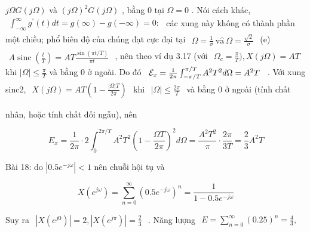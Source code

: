 \documentclass[
  10
]{article}
\begin{document}
\(j \Omega G ( j \Omega )\) và \(( j \Omega ) ^ { 2 } G ( j \Omega )\) ,
bằng 0 tại \(\Omega = 0\) . Nói cách khác,
\(\begin{array} { r } { \int _ { - \infty } ^ { \infty } g ^ { \prime } ( t ) d t = g ( \infty ) - g ( - \infty ) = 0 { : } } \end{array}\)
các xung này không có thành phần một chiều; phổ biên độ của chúng đạt
cực đại tại
\(\begin{array} { r } { \Omega = \frac { 1 } { \sigma } \mathrm { \ v { \hat { a } } \ } \Omega = \frac { \sqrt { 2 } } { \sigma } } \end{array}\)
(e)
\(\begin{array} { r } { A \operatorname { s i n c } ( \frac { t } { T } ) = A T \frac { \sin ( \pi t / T ) } { \pi t } } \end{array}\)
, nên theo ví dụ 3.17 (với
\(\begin{array} { r } { \Omega _ { c } = \frac { \pi } { T } ) , X ( j \Omega ) = A T } \end{array}\)
khi \(\left| \Omega \right| \leq \frac { \pi } { T }\) và bằng 0 ở
ngoài. Do đó
\(\begin{array} { r } { { \cal E } _ { x } = \frac { 1 } { 2 \pi } \int _ { - \pi / T } ^ { \pi / T } A ^ { 2 } T ^ { 2 } d \Omega = A ^ { 2 } T } \end{array}\)
. Với xung sinc2,
\(\begin{array} { r } { X ( j \Omega ) = A T \left( 1 - \frac { | \Omega | T } { 2 \pi } \right) } \end{array}\)
khi
\(\begin{array} { r } { | \Omega | \le \frac { 2 \pi } { T } } \end{array}\)
và bằng 0 ở ngoài (tính chất

nhân, hoặc tính chất đối ngẫu), nên

\[
E _ {x} = \frac {1}{2 \pi} \cdot 2 \int_ {0} ^ {2 \pi / T} A ^ {2} T ^ {2} \left(1 - \frac {\Omega T}{2 \pi}\right) ^ {2} d \Omega = \frac {A ^ {2} T ^ {2}}{\pi} \cdot \frac {2 \pi}{3 T} = \frac {2}{3} A ^ {2} T
\]

Bài 18: do \(| 0 . 5 e ^ { - j \omega } | < 1\) nên chuỗi hội tụ và

\[
X (e ^ {j \omega}) = \sum_ {n = 0} ^ {\infty} (0. 5 e ^ {- j \omega}) ^ {n} = \frac {1}{1 - 0 . 5 e ^ {- j \omega}}
\]

Suy ra
\(\begin{array} { r } { | X ( e ^ { j 0 } ) | = 2 , | X ( e ^ { j \pi } ) | = \frac { 2 } { 3 } } \end{array}\)
. Năng lượng
\(\begin{array} { r } { E = \sum _ { n = 0 } ^ { \infty } ( 0 . 2 5 ) ^ { n } = \frac { 4 } { 3 } , } \end{array}\)
\end{document}
